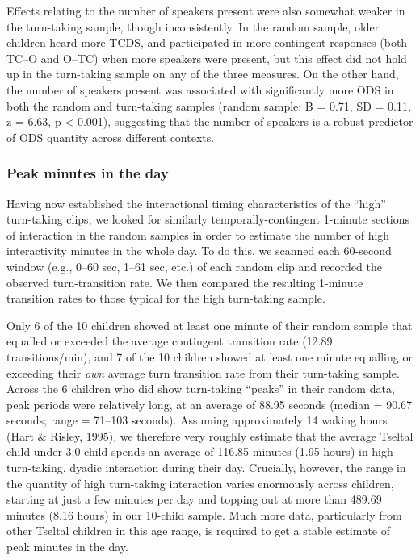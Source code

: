 \documentclass[floatsintext,man]{apa6}
\theoremstyle{definition}
\theoremstyle{definition}
\theoremstyle{definition}
\theoremstyle{remark}
\begin{document}
Effects relating to the number of speakers present were also somewhat
weaker in the turn-taking sample, though inconsistently. In the random
sample, older children heard more TCDS, and participated in more
contingent responses (both TC--O and O--TC) when more speakers were
present, but this effect did not hold up in the turn-taking sample on
any of the three measures. On the other hand, the number of speakers
present was associated with significantly more ODS in both the random
and turn-taking samples (random sample: B = 0.71, SD = 0.11, z = 6.63, p
\textless{} 0.001), suggesting that the number of speakers is a robust
predictor of ODS quantity across different contexts.

\subsubsection{Peak minutes in the day}\label{peak-minutes-in-the-day}

Having now established the interactional timing characteristics of the
\enquote{high} turn-taking clips, we looked for similarly
temporally-contingent 1-minute sections of interaction in the random
samples in order to estimate the number of high interactivity minutes in
the whole day. To do this, we scanned each 60-second window (e.g., 0--60
sec, 1--61 sec, etc.) of each random clip and recorded the observed
turn-transition rate. We then compared the resulting 1-minute transition
rates to those typical for the high turn-taking sample.

Only 6 of the 10 children showed at least one minute of their random
sample that equalled or exceeded the average contingent transition rate
(12.89 transitions/min), and 7 of the 10 children showed at least one
minute equalling or exceeding their \emph{own} average turn transition
rate from their turn-taking sample. Across the 6 children who did show
turn-taking \enquote{peaks} in their random data, peak periods were
relatively long, at an average of 88.95 seconds (median = 90.67 seconds;
range = 71--103 seconds). Assuming approximately 14 waking hours (Hart
\& Risley, 1995), we therefore very roughly estimate that the average
Tseltal child under 3;0 child spends an average of 116.85 minutes (1.95
hours) in high turn-taking, dyadic interaction during their day.
Crucially, however, the range in the quantity of high turn-taking
interaction varies enormously across children, starting at just a few
minutes per day and topping out at more than 489.69 minutes (8.16 hours)
in our 10-child sample. Much more data, particularly from other Tseltal
children in this age range, is required to get a stable estimate of peak
minutes in the day.
\end{document}
